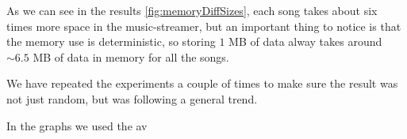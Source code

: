 As we can see in the results \ref{fig:memoryDiffSizes},
each song takes about six times more space in the music-streamer, 
but an important thing to notice is that the memory use is deterministic,
so storing $1$ MB of data alway takes around $\sim6.5$ MB of data in memory for all the songs.

We have repeated the experiments a couple of times to make sure the result was not just random, 
but was following a general trend. 

In the graphs we used the av
